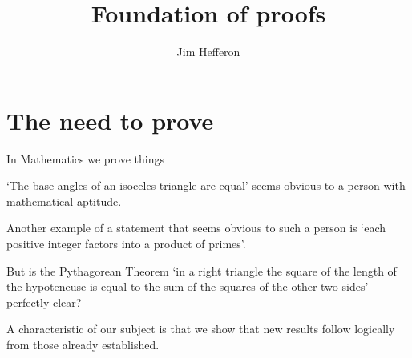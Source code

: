 \documentclass[10pt,t]{beamer}
\title[Foundation of proofs] %
{Foundation of proofs}
\author{{\small Jim Hef{}feron}}
\institute{
  \texttt{http://joshua.smcvt.edu/proofs}
}
\date{}
\begin{document}
\begin{frame}
  \titlepage
\end{frame}



\section{The need to prove}
\begin{frame}{In Mathematics we prove things}

`The base angles of an isoceles triangle are equal' seems obvious
to a person with mathematical aptitude.
\begin{center}\small
  \hspace*{2em}
\end{center}
Another example of a statement that seems obvious to such a person
is `each positive integer factors into a product of primes'. 

\pause
But is the Pythagorean Theorem `in a right triangle the 
square of the length of the hypoteneuse is equal to the sum
of the squares of the other two sides' perfectly clear?

A characteristic of our subject is 
that we show that new results follow logically from those already established.  
\end{frame}
\end{document}

